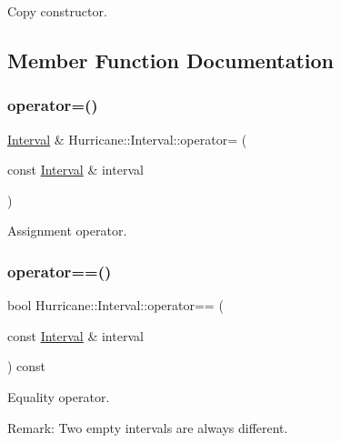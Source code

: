 Copy constructor. 

\subsection{Member Function Documentation}
\mbox{\label{classHurricane_1_1Interval_a337b424cea8024f574726c3a2e4935b8}} 
\subsubsection{\texorpdfstring{operator=()}{operator=()}}
{\footnotesize\ttfamily \mbox{\hyperlink{classHurricane_1_1Interval}{Interval}} \& Hurricane\+::\+Interval\+::operator= (\begin{DoxyParamCaption}\item[{const \mbox{\hyperlink{classHurricane_1_1Interval}{Interval}} \&}]{interval }\end{DoxyParamCaption})}

Assignment operator. \mbox{\label{classHurricane_1_1Interval_a1b022ac0ad975f168ac2b2689e6368c3}} 
\subsubsection{\texorpdfstring{operator==()}{operator==()}}
{\footnotesize\ttfamily bool Hurricane\+::\+Interval\+::operator== (\begin{DoxyParamCaption}\item[{const \mbox{\hyperlink{classHurricane_1_1Interval}{Interval}} \&}]{interval }\end{DoxyParamCaption}) const}

Equality operator.

\begin{DoxyParagraph}{Remark\+: Two empty intervals are always different. }

\end{DoxyParagraph}
\mbox{\label{classHurricane_1_1Interval_a2e5a64c485269fb08fb762e1eb3bc374}} 
